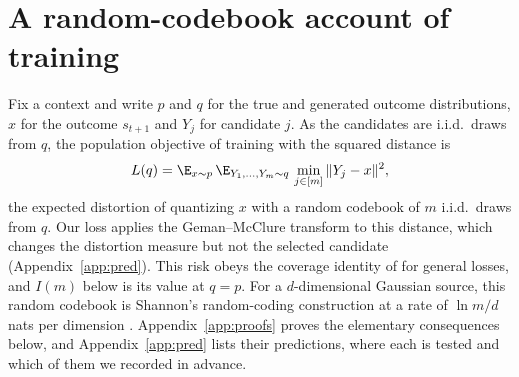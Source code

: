 \section{A random-codebook account of \nom{} training}
\label{sec:theory}
Fix a context and write $p$ and $q$ for the true and generated outcome distributions, $x$ for the outcome $s_{t+1}$ and $Y_j$ for candidate $j$. As the candidates are i.i.d.\ draws from $q$, the population objective of \nom{} training with the squared distance is
\begin{equation}
L(q) = \E_{x \sim p}\, \E_{Y_1,\dots,Y_m \sim q}\, \min_{j \in [m]} \| Y_j - x \|^2 ,
\label{eq:codebook}
\end{equation}
the expected distortion of quantizing $x$ with a random codebook of $m$ i.i.d.\ draws from $q$. Our loss applies the Geman--McClure transform to this distance, which changes the distortion measure but not the selected candidate (Appendix~\ref{app:pred}). This risk obeys the coverage identity of \citet[Theorem~1]{bennett2026freedom} for general losses, and $I(m)$ below is its value at $q = p$. For a $d$-dimensional Gaussian source, this random codebook is Shannon's random-coding construction at a rate of $\ln m / d$ nats per dimension \citep{shannon1959coding}. Appendix~\ref{app:proofs} proves the elementary consequences below, and Appendix~\ref{app:pred} lists their predictions, where each is tested and which of them we recorded in advance.

